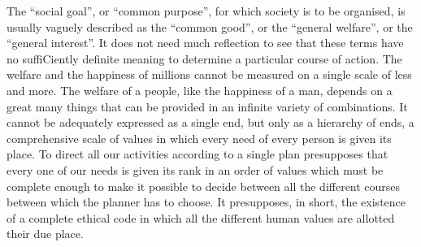 \documentclass[11pt,openany]{book}
\begin{document}
The ``social goal'', or ``common purpose'', for which society is to be organised, is usually vaguely described as the ``common good'', or the ``general welfare'', or the ``general interest''. It does not need much reflection to see that these terms have no suffiCiently definite meaning to determine a particular course of action. The welfare and the happiness of millions cannot be measured on a single scale of less and more. The welfare of a people, like the happiness of a man, depends on a great many things that can be provided in an infinite variety of combinations. It cannot be adequately expressed as a single end, but only as a hierarchy of ends, a comprehensive scale of values in which every need of every person is given its place. To direct all our activities according to a single plan presupposes that every one of our needs is given its rank in an order of values which must be complete enough to make it possible to decide between all the different courses between which the planner has to choose. It presupposes, in short, the existence of a complete ethical code in which all the different human values are allotted their due place.
\end{document}
